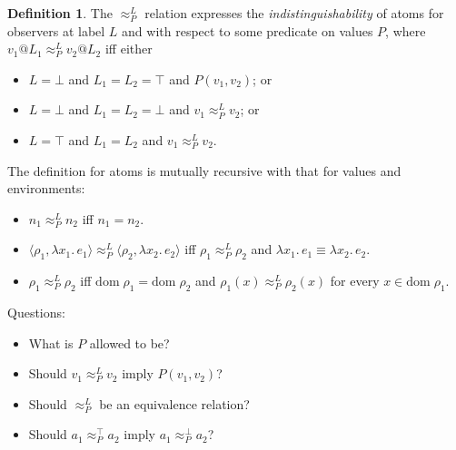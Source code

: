 \documentclass{article}
\makeatletter
\newcommand{\at}{\ensuremath{{\scriptstyle{@}}}}
\theoremstyle{definition}
\newtheorem{definition}{Definition}
\makeatother
\begin{document}
\begin{definition}
  The $\approx^{L}_{P}$ relation expresses the \emph{indistinguishability} of
  atoms for observers at label $L$ and with respect to some predicate on values
  $P$, where $v_1 \at L_1 \approx^{L}_{P} v_2 \at L_2$ iff either
  \begin{itemize}
  \item $L = \bot$ and
    $L_1 = L_2 = \top$ and $P(v_1, v_2)$; or
  \item $L = \bot$ and
    $L_1 = L_2 = \bot$ and $v_1 \approx^{L}_{P} v_2$; or
  \item $L = \top$ and $L_1 = L_2$ and $v_1 \approx^{L}_{P} v_2$.
  \end{itemize}
  The definition for atoms is mutually recursive with that for values and
  environments:
  \begin{itemize}
  \item $n_1 \approx^{L}_{P} n_2$ iff $n_1 = n_2$.
  \item
    $\langle{\rho_1, \lambda{x_1}.\, e_1\rangle} \approx^{L}_{P}
    \langle{\rho_2, \lambda{x_2}.\, e_2\rangle}$ iff
    $\rho_1 \approx^{L}_{P} \rho_2$ and
    $\lambda{x_1}.\, e_1 \equiv \lambda{x_2}.\, e_2$.
  \item $\rho_1 \approx^{L}_{P} \rho_2$ iff
    $\mathrm{dom}\; \rho_1 = \mathrm{dom}\; \rho_2$ and
    $\rho_1(x) \approx^{L}_{P} \rho_2(x)$ for every
    $x \in \mathrm{dom}\; \rho_1$.
  \end{itemize}
  \label{def:indistinguishability}
\end{definition}

\begin{flushleft}
  Questions:
\end{flushleft}

\begin{itemize}
\item What is $P$ allowed to be?
\item Should $v_1 \approx^{L}_{P} v_2$ imply $P(v_1,v_2)$?
\item Should $\approx^{L}_{P}$ be an equivalence relation?
\item Should $a_1 \approx^{\top}_{P} a_2$ imply $a_1 \approx^{\bot}_{P} a_2$?
\end{itemize}
\end{document}
